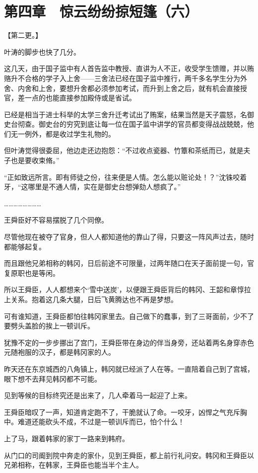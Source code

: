 \section{第四章　惊云纷纷掠短篷（六）}

【第二更。】

叶涛的脚步也快了几分。

这几天，由于国子监中有人首告监中教授、直讲为人不正，收受学生馈赠，并以贿赂升不合格的学子入上舍——三舍法已经在国子监中推行，两千多名学生分为外舍、内舍和上舍，要想升舍都必须参加考试，而升到上舍之后，就有机会直接授官，差一点的也能直接参加殿侍或是省试。

已经是相当于进士科举的太学三舍升迁考试出了贿案，结果当然是天子震怒，名御史台彻查。御史台的穷究到底让每一位在国子监中讲学的官员都变得战战兢兢，他们无一例外，都是收过学生礼物的。

但叶涛觉得很委屈，他边走还边抱怨：“不过收点瓷器、竹簟和茶纸而已，就是夫子也是要收束脩。”

“正如致远所言。即有师徒之份，往来便是人情。怎么能以赃论处！？”沈铢咬着牙，“这哪里是不通人情，实在是御史台想弹劾人想疯了。”

……………………

王舜臣好不容易摆脱了几个同僚。

尽管他现在被夺了官身，但人人都知道他的靠山了得，只要这一阵风声过去，随时都能够起复。

而且跟他兄弟相称的韩冈，日后前途不可限量，过两年随口在天子面前提一句，官复原职也是等闲。

所以王舜臣，人人都想来个‘雪中送炭’，以便跟王舜臣背后的韩冈、王韶和章惇拉上关系。抱着这几条大腿，日后飞黄腾达也不再是梦想。

可有谁知道，王舜臣都怕往韩冈家里去。自己做下的蠢事，到了三哥面前，少不了要劈头盖脸的挨上一顿训斥。

犹豫不定的一步步挪出了宫门，王舜臣带在身边的伴当身旁，还站着两名身穿赤色元随袍服的汉子，都是韩冈家的人。

昨天还在东京城西的八角镇上，韩冈就已经派了人在等。一直陪着自己到了宫城，眼下想不去拜见韩冈都不可能。

见到等候的目标终究还是出来了，几人牵着马一起迎了上来。

王舜臣暗叹了一声，知道肯定跑不了，干脆就认了命。一咬牙，凶悍之气充斥胸中。难道还能砍头不成，不过是一顿训斥而已，怕个什么！

上了马，跟着韩家的家丁一路来到韩府。

从门口的司阍到院中奔走的家仆，见到王舜臣，都上前行礼问安。韩冈和王舜臣以兄弟相称，在韩家，王舜臣也能当半个主人。


